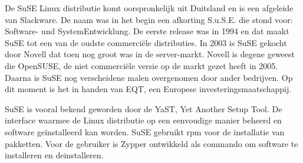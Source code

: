 De SuSE Linux distributie komt oorspronkelijk uit Duitsland en is een afgeleide van Slackware. De naam was in het begin een afkorting S.u.S.E. die stond voor: Software- und SystemEntwicklung. De eerste release was in 1994 en dat maakt SuSE tot een van de oudste commerci\"ele distributies. In 2003 is SuSE gekocht door Novell dat toen nog groot was in de server-markt. Novell is degene geweest die OpenSUSE, de niet commerci\"ele versie op de markt gezet heeft in 2005. Daarna is SuSE nog verscheidene malen overgenomen door ander bedrijven. Op dit moment is het in handen van EQT, een Europese investeringsmaatschappij.

SuSE is vooral bekend geworden door de YaST, Yet Another Setup Tool. De interface waarmee de Linux distributie op een eenvoudige manier beheerd en software ge\"installeerd kan worden. SuSE gebruikt rpm voor de installatie van pakketten. Voor de gebruiker is Zypper ontwikkeld als commando om software te installeren en deinstalleren.
